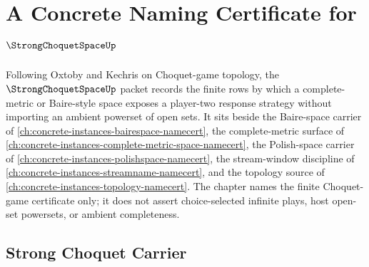 \chapter{A Concrete Naming Certificate for $\StrongChoquetSpaceUp$}
\label{ch:concrete-instances-strong-choquet-space-namecert}

Following Oxtoby and Kechris on Choquet-game topology, the $\StrongChoquetSpaceUp$ packet records the finite rows by which a complete-metric or Baire-style space exposes a player-two response strategy without importing an ambient powerset of open sets. It sits beside the Baire-space carrier of \autoref{ch:concrete-instances-bairespace-namecert}, the complete-metric surface of \autoref{ch:concrete-instances-complete-metric-space-namecert}, the Polish-space carrier of \autoref{ch:concrete-instances-polishspace-namecert}, the stream-window discipline of \autoref{ch:concrete-instances-streamname-namecert}, and the topology source of \autoref{ch:concrete-instances-topology-namecert}. The chapter names the finite Choquet-game certificate only; it does not assert choice-selected infinite plays, host open-set powersets, or ambient completeness.

\section{Strong Choquet Carrier}
\label{sec:strong-choquet-space-carrier}

